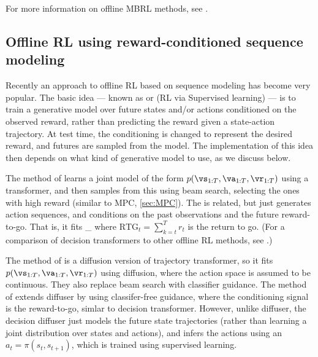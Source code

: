 For more information on offline MBRL methods,
see \citep{Chen2024offline}.



 
\subsection{Offline RL using reward-conditioned sequence modeling}
\label{sec:seqModel}

Recently an approach to offline RL
based on sequence modeling has become very popular.
The basic idea --- known as 
\citep{Schmidhuber2019}
or  (RL via Supervised learning)
\citep{Kumar2019,Emmons2021} ---
is to train a generative model over future states
and/or actions conditioned on the observed reward,
rather than predicting the reward given a state-action
trajectory.
At test time, the conditioning is changed
to represent the desired reward, and futures
are sampled from the model.
The implementation of this idea then depends on what
kind of generative model to use, as we discuss below.

The 
method of \citep{trajectoryTransformer}
learns a joint model of the form
$p(\vs_{1:T}, \va_{1:T}, \vr_{1:T})$
using a transformer,
and then samples from this using beam search,
selecting the ones with high reward (similar to MPC, \cref{sec:MPC}).
The  \citep{decisionTransformer}
is related, but  just generates action sequences,
and conditions on the past observations and the future reward-to-go.
That is, it fits
\be
\argmax_{\vtheta} 
\ee
where $\text{RTG}_t = \sum_{k=t}^T r_t$ is the return to go.
(For a comparison of decision transformers to other offline RL methods,
see \citep{Bhargava2024}.)

The  method of \citep{diffuser}
is a diffusion version of trajectory transformer,
so it fits $p(\vs_{1:T}, \va_{1:T}, \vr_{1:T})$ using diffusion,
where the action space is assumed to be continuous.
They also replace beam search with classifier guidance.
The  method of \citep{decisionDiffuser}
extends diffuser by using classifer-free guidance,
where the conditioning signal is the reward-to-go,
simlar to decision transformer.
However, unlike diffuser,
the decision diffuser just models the future state trajectories
(rather than learning a joint distribution over states and actions),
and infers the actions using an 
$a_t = \pi(s_t, s_{t+1})$,
which is trained using supervised learning.

